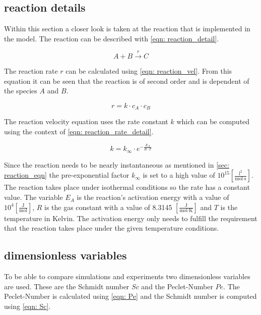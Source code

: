 \documentclass[../thesis.tex]{subfiles}
\begin{document}
\subsection{reaction details}

Within this section a closer look is taken at the reaction that is implemented in the model. The reaction can be described with \autoref{eqn: reaction_detail}.

\begin{equation}
	\label{eqn: reaction_detail}
	A + B \xrightarrow{r} C
\end{equation}

The reaction rate $r$ can be calculated using \autoref{eqn: reaction_vel}. From this equation it can be seen that the reaction is of second order and is dependent of the species $A$ and $B$.

\begin{equation}
	\label{eqn: reaction_vel}
	r = k \cdot c_A \cdot c_B
\end{equation}

The reaction velocity equation uses the rate constant $k$ which can be computed using the context of \autoref{eqn: reaction_rate_detail}.

\begin{equation}
	\label{eqn: reaction_rate_detail}
	k = k_{\infty} \cdot e^{- \frac{E_A}{R \cdot T}}
\end{equation}

Since the reaction needs to be nearly instantaneous as mentioned in \autoref{sec: reaction_eqn} the pre-exponential factor $k_{\infty}$ is set to a high value of $10^{15} \left[ \frac{\text{l}^2}{\text{mol} \cdot \text{s}} \right] $. The reaction takes place under isothermal conditions so the rate has a constant value. The variable $E_A$ is the reaction's activation energy with a value of $10^4 \left[ \frac{\text{J}}{\text{mol}} \right] $, $R$ is the gas constant with a value of 8.3145 $\left[ \frac{\text{J}}{\text{mol} \cdot \text{K}} \right] $ and $T$ is the temperature in Kelvin. The activation energy only needs to fulfill the requirement that the reaction takes place under the given temperature conditions.

\subsection{dimensionless variables}

To be able to compare simulations and experiments two dimensionless variables are used. These are the Schmidt number $Sc$ and the Peclet-Number $Pe$. The Peclet-Number is calculated using \autoref{eqn: Pe} and the Schmidt number is computed using \autoref{eqn: Sc}.
\end{document}
